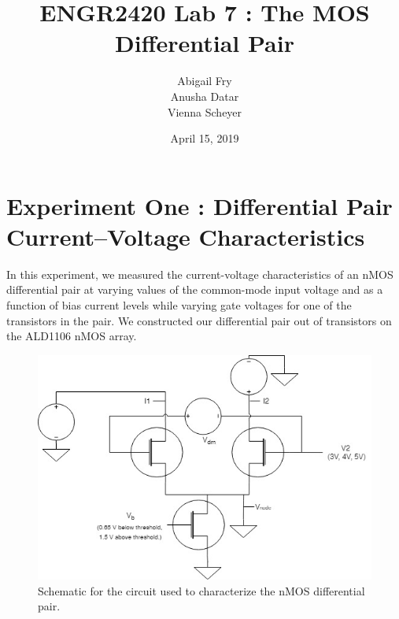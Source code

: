 \documentclass{article}
\title{ENGR2420 Lab 7 : The MOS Differential Pair}
\author{Abigail Fry\\ Anusha Datar\\ Vienna Scheyer}
\date{April 15, 2019}
\begin{document}
\maketitle

\section{Experiment One : Differential Pair Current–Voltage Characteristics}
In this experiment, we measured the current-voltage characteristics of an nMOS differential pair at varying values of the common-mode input voltage and as a function of bias current levels while varying gate voltages for one of the transistors in the pair.  We constructed our differential pair out of transistors on the ALD1106 nMOS array. 

\begin{figure}[H]
  \begin{center}      
  \includegraphics[scale = 0.5]{images/exp1_schematic.jpg}
  \caption{Schematic for the circuit used to characterize the nMOS differential pair.}   
  \label{fig:exp1_schematic}
  \end{center}
\end{figure}
\end{document}
